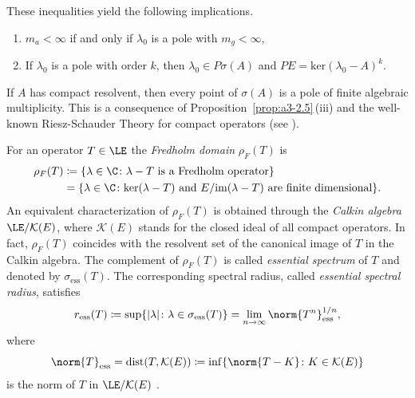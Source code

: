 \begin{example}
These inequalities yield the following implications.
\begin{enumerate}[\upshape (i)]
\item
$m_{a} < \infty$ if and only if\/ $\lambda_{0}$ is a pole with $m_{g} < \infty$,
\item
If\/ $\lambda_{0}$ is a pole with order $k$, then $\lambda_{0} \in P\sigma(A)$ and $PE = \text{ker}(\lambda_{0} - A)^{k}$.
\end{enumerate}
If\/ $A$ has compact resolvent,%
then every point of\/ $\sigma(A)$ is a pole of finite algebraic multiplicity.
This is a consequence of Proposition~\ref{prop:a3-2.5}\,(iii) and the well-known Riesz-Schauder Theory for compact operators (see \textcite[VII.4.5]{dunfordschwartz:1958}).
\end{example}
\begin{example}\label{ex:a3-3.7}	%
For an operator $T \in \LE$ the \emph{Fredholm domain} $\rho_{F}(T)$ is
\begin{equation}\label{eq:a3-3.5} 
\begin{aligned}
	\rho_{F}(T) & \coloneqq  \{\lambda \in \C \colon \lambda - T \text{ is a Fredholm operator}\}\\
	& =  \{\lambda \in \C \colon \text{ker}(\lambda - T) \text{ and }  E / \mathrm{im}(\lambda - T) \text{ are finite dimensional}\}.
\end{aligned}
\end{equation}
An equivalent characterization of\/ $\rho_{F}(T)$ is obtained through the \emph{Calkin algebra}%
$\LE/\mathcal{K}(E)$, where $\mathcal{K}(E)$ stands for the closed ideal of all compact operators.
In fact, $\rho_{F}(T)$ coincides with the resolvent set of the canonical image of\/ $T$ in the Calkin algebra.
The complement of\/ $\rho_{F}(T)$ is called \emph{essential spectrum} 
of\/ $T$ and denoted by $\sigma_{\text{ess}}(T)$.
The corresponding spectral radius, called \emph{essential spectral radius},  
satisfies
\begin{equation}\label{eq:a3-3.6}
r_{\text{ess}}(T) \coloneqq \sup \{|\lambda| \colon \lambda \in \sigma_{\text{ess}}(T)\} = \lim_{n \to \infty} \norm{T^{n}}_{\text{ess}}^{1/n} ,
\end{equation}
where 
%
\[
	\norm{T}_{\text{ess}} = \text{dist}(T,\mathcal{K}(E)) \coloneqq \inf \{\norm{T - K} \colon K \in \mathcal{K}(E)\}
\]
%
is the norm of\/ $T$ in $\LE/\mathcal{K}(E)$ .


\end{example}
